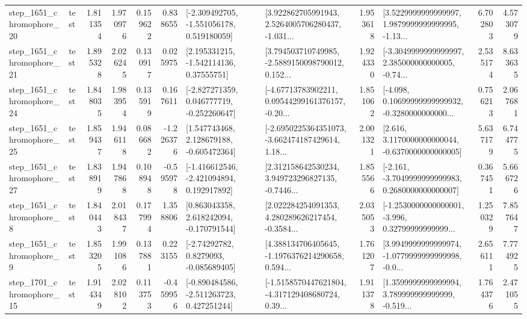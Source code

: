 \begin{tabular}{llrrrrllrlrr}
 step\_1651\_chromophore\_20 &      test &      1.811354 &    1.970976 &      0.159622 &  0.838655 &   [-2.309492705, -1.551056178, 0.519180059] &  [3.922862705991943, 2.5264005706280437, -1.031... &       1.953618 &  [3.5229999999999997, 1.9879999999999995, -1.13... &            6.702803 &          4.573079 \\
 step\_1651\_chromophore\_21 &      test &      1.895328 &    2.026245 &      0.130917 &  0.025975 &     [2.195331215, -1.542114136, 0.37555751] &  [3.794503710749985, -2.5889150098790012, 0.152... &       1.924330 &  [-3.3049999999999997, 2.385000000000005, -0.74... &            2.535174 &          8.633635 \\
 step\_1651\_chromophore\_24 &      test &      1.848035 &    1.983954 &      0.135919 &  0.167611 &   [-2.827271359, 0.046777719, -0.252260647] &  [-4.67713783902211, 0.09544299161376157, -0.20... &       1.851062 &  [-4.098, 0.10699999999999932, -0.3280000000000... &            0.756213 &          2.067681 \\
 step\_1651\_chromophore\_25 &      test &      1.859437 &    1.946118 &      0.086682 & -1.226376 &    [1.547743468, 2.128679188, -0.605472364] &  [-2.6950225364351073, -3.662474187429614, 1.18... &       2.001321 &   [2.616, 3.1170000000000044, -0.6370000000000005] &            5.637179 &          6.744775 \\
 step\_1651\_chromophore\_27 &      test &      1.838919 &    1.947868 &      0.108948 & -0.595978 &   [-1.416612546, -2.421094894, 0.192917892] &  [2.312158642530234, 3.949723296827135, -0.7446... &       1.855566 &  [-2.161, -3.7049999999999983, 0.2680000000000007] &            0.367451 &          5.666726 \\
  step\_1651\_chromophore\_8 &      test &      1.840443 &    2.018437 &      0.177994 &  1.358806 &    [0.863043358, 2.618242094, -0.170791544] &  [2.022284254091353, 4.280289626217454, -0.3584... &       2.035053 &  [-1.2530000000000001, -3.996, 0.32799999999999... &            1.250329 &          7.857647 \\
  step\_1651\_chromophore\_9 &      test &      1.853205 &    1.991086 &      0.137881 &  0.223155 &      [-2.74292782, 0.8279093, -0.085689405] &  [4.388134706405645, -1.1976376214290658, 0.594... &       1.761207 &  [3.9949999999999974, -1.0779999999999998, -0.0... &            2.656111 &          7.774925 \\
 step\_1701\_chromophore\_15 &      test &      1.914349 &    2.028102 &      0.113753 & -0.459956 &   [-0.890484586, -2.511263723, 0.427251244] &  [-1.5158570447621804, -4.317129408680724, 0.39... &       1.911378 &  [1.3599999999999994, 3.789999999999999, -0.519... &            1.764376 &          2.471055 \\

\end{tabular}

